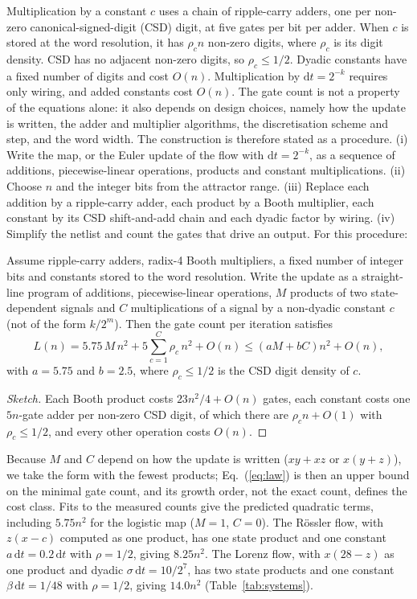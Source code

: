 \documentclass[ASNA,twocolumn]{USG}
\begin{document}
Multiplication by a constant $c$ uses a chain of ripple-carry adders, one per non-zero
canonical-signed-digit (CSD) digit, at five gates per bit per adder. When $c$ is
stored at the word resolution, it has $\rho_c n$ non-zero digits, where $\rho_c$ is its
digit density. CSD has no adjacent non-zero digits, so $\rho_c \le 1/2$. Dyadic
constants have a fixed number of digits and cost $O(n)$. Multiplication by
$\mathrm{d}t = 2^{-k}$ requires only wiring, and added constants cost $O(n)$. The gate count is not a property of the equations alone: it also depends on design
choices, namely how the update is written, the adder and multiplier algorithms, the
discretisation scheme and step, and the word width. The construction is therefore stated
as a procedure. (i) Write the map, or the Euler update of the flow with
$\mathrm{d}t=2^{-k}$, as a sequence of additions, piecewise-linear operations, products
and constant multiplications. (ii) Choose $n$ and the integer bits from the attractor
range. (iii) Replace each addition by a ripple-carry adder, each product by a Booth
multiplier, each constant by its CSD shift-and-add chain and each dyadic factor by
wiring. (iv) Simplify the netlist and count the gates that drive an output.
For this procedure:

\begin{proposition}\label{prop:law}
Assume ripple-carry adders, radix-4 Booth multipliers, a fixed number of integer bits and
constants stored to the word resolution. Write the update as a straight-line program of
additions, piecewise-linear operations, $M$ products of two state-dependent signals and
$C$ multiplications of a signal by a non-dyadic constant $c$ (not of the form $k/2^m$).
Then the gate count per iteration satisfies
\begin{equation}
  L(n) = 5.75\,M\,n^2 + 5\sum_{c=1}^{C} \rho_c\, n^2 + O(n)
       \le \left(aM + bC\right) n^2 + O(n),
  \label{eq:law}
\end{equation}
with $a = 5.75$ and $b = 2.5$, where $\rho_c \le 1/2$ is the CSD digit density of $c$.
\end{proposition}
\begin{proof}[Sketch]
Each Booth product costs $23n^2/4+O(n)$ gates, each constant costs one $5n$-gate adder per
non-zero CSD digit, of which there are $\rho_c n+O(1)$ with $\rho_c\le1/2$, and every other
operation costs $O(n)$.
\end{proof}
Because $M$ and $C$ depend on how the update is written ($xy+xz$ or $x(y+z)$), we take the
form with the fewest products; Eq.~(\ref{eq:law}) is then an upper bound on the minimal
gate count, and its growth order, not the exact count, defines the cost class. Fits to the measured counts give
the predicted quadratic terms, including $5.75n^2$ for the logistic map ($M = 1$, $C = 0$).
The R\"ossler flow, with $z(x-c)$ computed as one product, has one state product and
one constant $a\,\mathrm{d}t = 0.2\,\mathrm{d}t$ with $\rho = 1/2$, giving $8.25n^2$.
The Lorenz flow, with $x(28-z)$ as one product and dyadic $\sigma\,\mathrm{d}t = 10/2^7$, has
two state products and one constant $\beta\,\mathrm{d}t = 1/48$ with $\rho = 1/2$, giving $14.0n^2$
(Table~\ref{tab:systems}).
\end{document}
